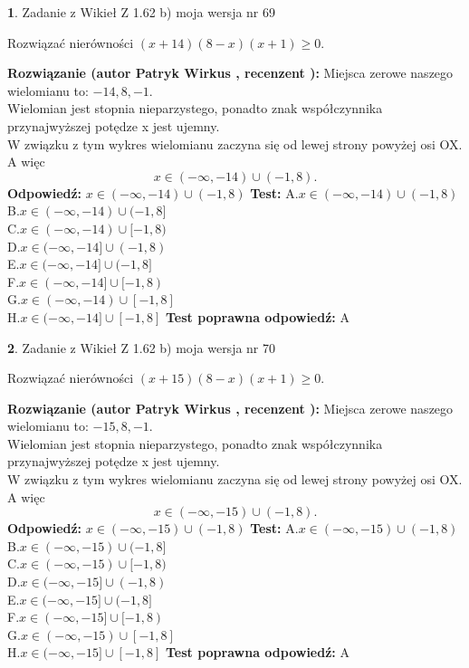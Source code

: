 \documentclass[12pt, a4paper]{article}
\theoremstyle{definition} %
\newtheorem{zad}{}
\newcommand{\zadStart}[1]{\begin{zad}#1\newline}
\newcommand{\zadStop}{\end{zad}}
\newcommand{\rozwStart}[2]{\noindent \textbf{Rozwiązanie (autor #1 , recenzent #2): }\newline}
\newcommand{\rozwStop}{\newline}
\newcommand{\odpStart}{\noindent \textbf{Odpowiedź:}\newline}
\newcommand{\odpStop}{\newline}
\newcommand{\testStart}{\noindent \textbf{Test:}\newline}
\newcommand{\testStop}{\newline}
\newcommand{\kluczStart}{\noindent \textbf{Test poprawna odpowiedź:}\newline}
\newcommand{\kluczStop}{\newline}
\begin{document}
\zadStart{Zadanie z Wikieł Z 1.62 b) moja wersja nr 69}

Rozwiązać nierówności $(x+14)(8-x)(x+1)\ge0$.
\zadStop
\rozwStart{Patryk Wirkus}{}
Miejsca zerowe naszego wielomianu to: $-14, 8, -1$.\\
Wielomian jest stopnia nieparzystego, ponadto znak współczynnika przy\linebreak najwyższej potędze x jest ujemny.\\ W związku z tym wykres wielomianu zaczyna się od lewej strony powyżej osi OX. A więc $$x \in (-\infty,-14) \cup (-1,8).$$
\rozwStop
\odpStart
$x \in (-\infty,-14) \cup (-1,8)$
\odpStop
\testStart
A.$x \in (-\infty,-14) \cup (-1,8)$\\
B.$x \in (-\infty,-14) \cup (-1,8]$\\
C.$x \in (-\infty,-14) \cup [-1,8)$\\
D.$x \in (-\infty,-14] \cup (-1,8)$\\
E.$x \in (-\infty,-14] \cup (-1,8]$\\
F.$x \in (-\infty,-14] \cup [-1,8)$\\
G.$x \in (-\infty,-14) \cup [-1,8]$\\
H.$x \in (-\infty,-14] \cup [-1,8]$
\testStop
\kluczStart
A
\kluczStop



\zadStart{Zadanie z Wikieł Z 1.62 b) moja wersja nr 70}

Rozwiązać nierówności $(x+15)(8-x)(x+1)\ge0$.
\zadStop
\rozwStart{Patryk Wirkus}{}
Miejsca zerowe naszego wielomianu to: $-15, 8, -1$.\\
Wielomian jest stopnia nieparzystego, ponadto znak współczynnika przy\linebreak najwyższej potędze x jest ujemny.\\ W związku z tym wykres wielomianu zaczyna się od lewej strony powyżej osi OX. A więc $$x \in (-\infty,-15) \cup (-1,8).$$
\rozwStop
\odpStart
$x \in (-\infty,-15) \cup (-1,8)$
\odpStop
\testStart
A.$x \in (-\infty,-15) \cup (-1,8)$\\
B.$x \in (-\infty,-15) \cup (-1,8]$\\
C.$x \in (-\infty,-15) \cup [-1,8)$\\
D.$x \in (-\infty,-15] \cup (-1,8)$\\
E.$x \in (-\infty,-15] \cup (-1,8]$\\
F.$x \in (-\infty,-15] \cup [-1,8)$\\
G.$x \in (-\infty,-15) \cup [-1,8]$\\
H.$x \in (-\infty,-15] \cup [-1,8]$
\testStop
\kluczStart
A
\kluczStop
\end{document}
